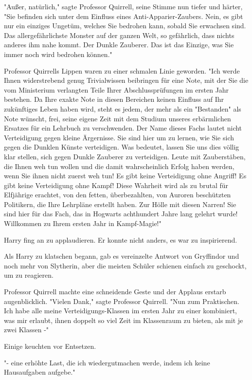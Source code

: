 {"Außer, natürlich," sagte Professor Quirrell, seine Stimme nun tiefer und härter, "Sie befinden sich unter dem Einfluss eines Anti-Apparier-Zaubers. Nein, es gibt nur ein einziges Ungetüm, welches Sie bedrohen kann, sobald Sie erwachsen sind. Das allergefährlichste Monster auf der ganzen Welt, so gefährlich, dass nichts anderes ihm nahe kommt. Der Dunkle Zauberer. Das ist das Einzige, was Sie immer noch wird bedrohen können."

Professor Quirrells Lippen waren zu einer schmalen Linie geworden. "Ich werde Ihnen widerstrebend genug Trivialwissen beibringen für eine Note, mit der Sie die vom Ministerium verlangten Teile Ihrer Abschlussprüfungen im ersten Jahr bestehen. Da Ihre exakte Note in diesen Bereichen keinen Einfluss auf Ihr zukünftiges Leben haben wird, steht es jedem, der mehr als ein "Bestanden" als Note wünscht, frei, seine eigene Zeit mit dem Studium unseres erbärmlichen Ersatzes für ein Lehrbuch zu verschwenden. Der Name dieses Fachs lautet nicht Verteidigung gegen kleine Ärgernisse. Sie sind hier um zu lernen, wie Sie sich gegen die Dunklen Künste verteidigen. Was bedeutet, lassen Sie uns dies völlig klar stellen, sich gegen Dunkle Zauberer zu verteidigen. Leute mit Zauberstäben, die Ihnen weh tun wollen und die damit wahrscheinlich Erfolg haben werden, wenn Sie ihnen nicht zuerst weh tun! Es gibt keine Verteidigung ohne Angriff! Es gibt keine Verteidigung ohne Kampf! Diese Wahrheit wird als zu brutal für Elfjährige erachtet, von den fetten, überbezahlten, von Auroren beschützten Politikern, die Ihre Lehrpläne erstellt haben. Zur Hölle mit diesen Narren! Sie sind hier für das Fach, das in Hogwarts achthundert Jahre lang gelehrt wurde! Willkommen zu Ihrem ersten Jahr in Kampf-Magie!"

Harry fing an zu applaudieren. Er konnte nicht anders, es war zu inspirierend.

Als Harry zu klatschen begann, gab es vereinzelte Antwort von Gryffindor und noch mehr von Slytherin, aber die meisten Schüler schienen einfach zu geschockt, um zu reagieren.

Professor Quirrell machte eine schneidende Geste und der Applaus erstarb augenblicklich. "Vielen Dank," sagte Professor Quirrell. "Nun zum Praktischen. Ich habe alle meine Verteidigungs-Klassen im ersten Jahr zu einer kombiniert, was mir erlaubt, ihnen doppelt so viel Zeit im Klassenraum zu bieten, als mit je zwei Klassen -"

Einige keuchten vor Entsetzen.

"- eine erhöhte Last, die ich wiedergutmachen werde, indem ich keine Hausaufgaben aufgebe."

}
